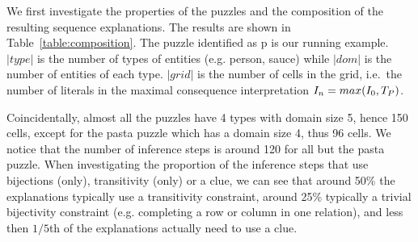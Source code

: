 We first investigate the properties of the puzzles and the composition of the resulting sequence explanations. The results are shown in Table~\ref{table:composition}. The puzzle identified as p is our running example. $|type|$ is the number of types of entities (e.g. person, sauce) while $|dom|$ is the number of entities of each type. $|grid|$ is the number of cells in the grid, i.e.\ the number of literals in the maximal consequence interpretation $I_n=max(I_0,T_P)$.
\begin{table}
	\centering
\caption{Composition of puzzle explanations}
\label{table:composition}
\end{table}
Coincidentally, almost all the puzzles have 4 types with domain size 5,  
hence 150 cells, except for the pasta puzzle which has a domain size 4, thus 96 cells. We notice that the number of inference steps is around 120 for all but the pasta puzzle. When investigating the proportion of the inference steps that use bijections (only), transitivity (only) or a clue, we can see that around 50\% the explanations typically use a transitivity constraint, around 25\% typically a trivial bijectivity constraint (e.g. completing a row or column in one relation), and less then $1/5$th of the explanations actually need to use a clue.
